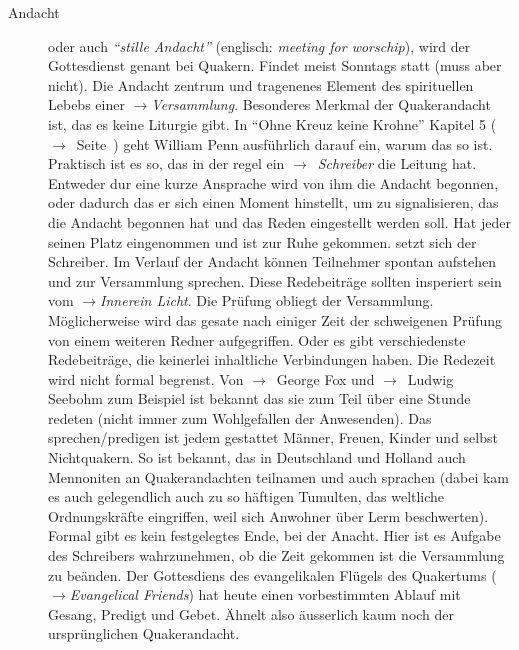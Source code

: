 \begin{description}
 \item[Andacht] oder auch \textit{"`stille Andacht"'} (englisch: \textit{meeting for worschip}), wird der Gottesdienst genant bei Quakern. Findet meist Sonntags statt (muss aber nicht). Die Andacht zentrum und tragenenes Element des spirituellen Lebebs einer $\to$\textit{Versammlung}. Besonderes Merkmal der Quakerandacht ist, das es keine Liturgie gibt. In "`Ohne Kreuz keine Krohne"' Kapitel 5 ($\to$~Seite~\pageref{kap5_ab1}) geht William Penn ausführlich darauf ein, warum das so ist. Praktisch ist es so, das in der regel ein $\to$~\textit{Schreiber} die Leitung hat. Entweder dur eine kurze Ansprache wird von ihm die Andacht begonnen, oder dadurch das er sich einen Moment hinstellt, um zu signalisieren, das die Andacht begonnen hat und das Reden eingestellt werden soll. Hat jeder seinen Platz eingenommen und ist zur Ruhe gekommen. setzt sich der Schreiber. Im Verlauf der Andacht können Teilnehmer spontan aufstehen und zur Versammlung sprechen. Diese Redebeiträge sollten insperiert sein vom $\to$\textit{Innerein Licht}. Die Prüfung obliegt der Versammlung. Möglicherweise wird das gesate nach einiger Zeit der schweigenen Prüfung von einem weiteren Redner aufgegriffen. Oder es gibt verschiedenste Redebeiträge, die keinerlei inhaltliche Verbindungen haben. Die Redezeit wird nicht formal begrenst. Von $\to$~George Fox und $\to$~Ludwig Seebohm zum Beispiel ist bekannt das sie zum Teil über eine Stunde redeten (nicht immer zum Wohlgefallen der Anwesenden). Das sprechen/predigen ist jedem gestattet Männer, Freuen, Kinder und selbst Nichtquakern. So ist bekannt, das in Deutschland und Holland auch Mennoniten an Quakerandachten teilnamen und auch sprachen (dabei kam es auch gelegendlich auch zu so häftigen Tumulten, das weltliche Ordnungskräfte eingriffen, weil sich Anwohner über Lerm beschwerten). Formal gibt es kein festgelegtes Ende, bei der Anacht. Hier ist es Aufgabe des Schreibers wahrzunehmen, ob die Zeit gekommen ist die Versammlung zu beänden.  Der Gottesdiens des evangelikalen Flügels des Quakertums ($\to$\textit{Evangelical Friends}) hat heute einen vorbestimmten Ablauf mit Gesang, Predigt und Gebet. Ähnelt also äusserlich kaum noch der ursprünglichen Quakerandacht.

 \end{description}
\normalsize
